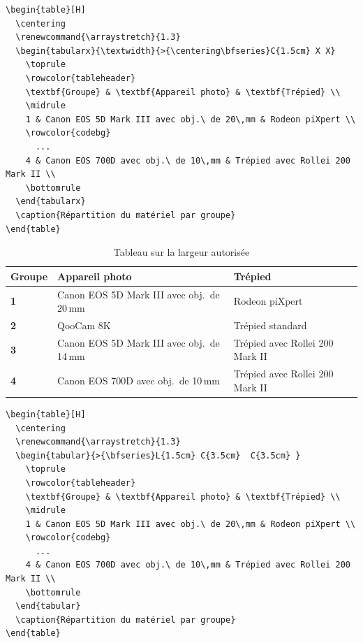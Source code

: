 \begin{verbatim}
\begin{table}[H]
  \centering
  \renewcommand{\arraystretch}{1.3}
  \begin{tabularx}{\textwidth}{>{\centering\bfseries}C{1.5cm} X X}
    \toprule
    \rowcolor{tableheader}
    \textbf{Groupe} & \textbf{Appareil photo} & \textbf{Trépied} \\
    \midrule
    1 & Canon EOS 5D Mark III avec obj.\ de 20\,mm & Rodeon piXpert \\
    \rowcolor{codebg}
      ...
    4 & Canon EOS 700D avec obj.\ de 10\,mm & Trépied avec Rollei 200 Mark II \\
    \bottomrule
  \end{tabularx}
  \caption{Répartition du matériel par groupe}
\end{table}
\end{verbatim}
\begin{table}[H]
  \centering
  \renewcommand{\arraystretch}{1.3}
  \begin{tabularx}{\textwidth}{>{\centering\bfseries}C{1.5cm} X Y}
    \toprule
    \textbf{Groupe} & \textbf{Appareil photo} & \textbf{Trépied} \\
     & Canon EOS 5D Mark III avec obj.\ de 20\,mm & Rodeon piXpert \\
    2 & QooCam 8K & Trépied standard \\
    3 & Canon EOS 5D Mark III avec obj.\ de 14\,mm & Trépied avec Rollei 200 Mark II \\
    4 & Canon EOS 700D avec obj.\ de 10\,mm & Trépied avec Rollei 200 Mark II \\
    \bottomrule
  \end{tabularx}
  \caption{Tableau sur la largeur autorisée}
\end{table}
\begin{verbatim}
\begin{table}[H]
  \centering
  \renewcommand{\arraystretch}{1.3}
  \begin{tabular}{>{\bfseries}L{1.5cm} C{3.5cm}  C{3.5cm} }
    \toprule
    \rowcolor{tableheader}
    \textbf{Groupe} & \textbf{Appareil photo} & \textbf{Trépied} \\
    \midrule
    1 & Canon EOS 5D Mark III avec obj.\ de 20\,mm & Rodeon piXpert \\
    \rowcolor{codebg}
      ...
    4 & Canon EOS 700D avec obj.\ de 10\,mm & Trépied avec Rollei 200 Mark II \\
    \bottomrule
  \end{tabular}
  \caption{Répartition du matériel par groupe}
\end{table}
\end{verbatim}
